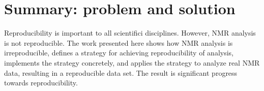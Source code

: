 \section{Summary: problem and solution}
Reproducibility is important to all scientifici disciplines.  However, NMR
analysis is not reproducible.  The work presented here shows how NMR analysis
is irreproducible, defines a strategy for achieving reproducibility of analysis,
implements the strategy concretely, and applies the strategy to analyze real
NMR data, resulting in a reproducible data set.  The result is significant 
progress towards reproducibility.


